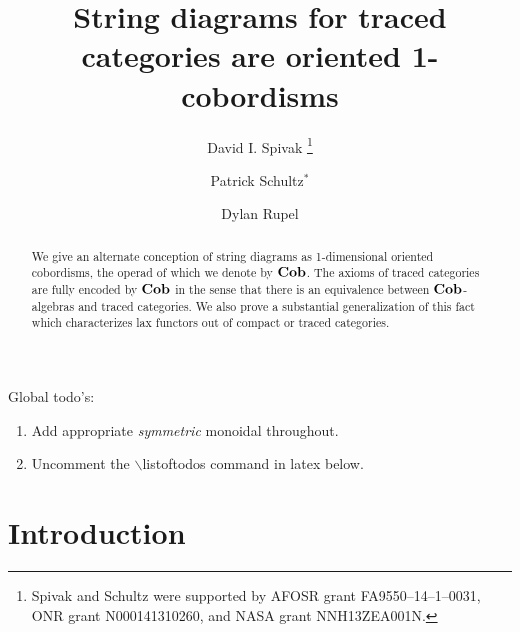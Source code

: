 \documentclass[12pt,oneside,article,draft]{memoir}
\title{String diagrams for traced categories are oriented 1-cobordisms}
\author{
   David I. Spivak
      \thanks{Spivak and Schultz were supported by AFOSR grant FA9550--14--1--0031, ONR grant N000141310260, and NASA grant NNH13ZEA001N.}
   \and Patrick Schultz${}^*$%
   \and Dylan Rupel
}
\begin{document}
\tightlists
\firmlists

\maketitle
\begin{abstract}
   We give an alternate conception of string diagrams as 1-dimensional oriented cobordisms, the
   operad of which we denote by $\mathbf{Cob}$. The axioms of traced categories are fully encoded by $\mathbf{Cob}$
   in the sense that there is an equivalence between $\mathbf{Cob}$-algebras and
   traced categories. We also prove a substantial generalization of this fact which characterizes
   lax functors out of compact or traced categories.
\end{abstract}
Global todo's:
\begin{enumerate}
   \item Add appropriate {\em symmetric\/} monoidal throughout.
   \item Uncomment the $\backslash${listoftodos} command in latex below.
\end{enumerate}

\setcounter{tocdepth}{1}
\tableofcontents*

\chapter{Introduction}
\end{document}
